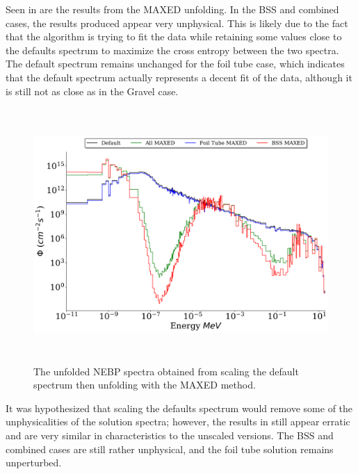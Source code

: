 Seen in  are the results from the MAXED unfolding.
In the BSS and combined cases, the results produced appear very unphysical.
This is likely due to the fact that the algorithm is trying to fit the data while retaining some values close to the defaults spectrum to maximize the cross entropy between the two spectra.
The default spectrum remains unchanged for the foil tube case, which indicates that the default spectrum actually represents a decent fit of the data, although it is still not as close as in the Gravel case.

\begin{figure}[htb]
\includegraphics[height=3.8in]{tex/figures/unfolded_mx_sc.png}
\caption[MAXED Unfolded Spectra (Scaled)]{The unfolded NEBP spectra obtained from scaling the default spectrum then unfolding with the MAXED method.}
\label{fig:unfolded_mx_sc}
\end{figure}

It was hypothesized that scaling the defaults spectrum would remove some of the unphysicalities of the solution spectra; however, the results in  still appear erratic and are very similar in characteristics to the unscaled versions.
The BSS and combined cases are still rather unphysical, and the foil tube solution remains unperturbed.

